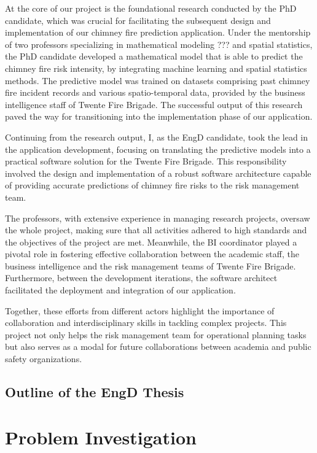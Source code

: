 \documentclass{utitcphd_overleaf}
\begin{document}
At the core of our project is the foundational research conducted by the PhD candidate, which was crucial for facilitating the subsequent design and implementation of our chimney fire prediction application. Under the mentorship of two professors specializing in mathematical modeling ??? and spatial statistics, the PhD candidate developed a mathematical model that is able to predict the chimney fire risk intensity, by integrating machine learning and spatial statistics methods. The predictive model was trained on datasets comprising past chimney fire incident records and various spatio-temporal data, provided by the business intelligence staff of Twente Fire Brigade. The successful output of this research paved the way for transitioning into the implementation phase of our application.

Continuing from the research output, I, as the EngD candidate, took the lead in the application development, focusing on translating the predictive models into a practical software solution for the Twente Fire Brigade. This responsibility involved the design and implementation of a robust software architecture capable of providing accurate predictions of chimney fire risks to the risk management team.

The professors, with extensive experience in managing research projects, oversaw the whole project, making sure that all activities adhered to high standards and the objectives of the project are met. Meanwhile, the BI coordinator played a pivotal role in fostering effective collaboration between the academic staff, the business intelligence and the risk management teams of Twente Fire Brigade. Furthermore, between the development iterations, the software architect facilitated the deployment and integration of our application.

Together, these efforts from different actors highlight the importance of collaboration and interdisciplinary skills in tackling complex projects. This project not only helps the risk management team for operational planning tasks but also serves as a modal for future collaborations between academia and public safety organizations.

\section{Outline of the EngD Thesis}


\chapter{Problem Investigation}
\label{chap:problem}
\end{document}
